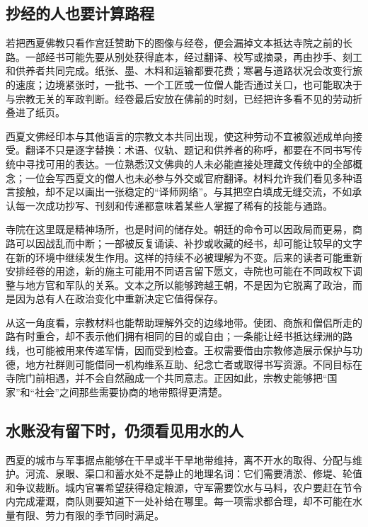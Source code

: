 \subsection{抄经的人也要计算路程}

若把西夏佛教只看作宫廷赞助下的图像与经卷，便会漏掉文本抵达寺院之前的长路。一部经书可能先要从别处获得底本，经过翻译、校写或摘录，再由抄手、刻工和供养者共同完成。纸张、墨、木料和运输都要花费；寒暑与道路状况会改变行旅的速度；边境紧张时，一批书、一个工匠或一位僧人能否通过关口，也可能取决于与宗教无关的军政判断。经卷最后安放在佛前的时刻，已经把许多看不见的劳动折叠进了纸页。

西夏文佛经印本与其他语言的宗教文本共同出现，使这种劳动不宜被叙述成单向接受。翻译不只是逐字替换：术语、仪轨、题记和供养者的称呼，都要在不同书写传统中寻找可用的表达。一位熟悉汉文佛典的人未必能直接处理藏文传统中的全部概念；一位会写西夏文的僧人也未必参与外交或官府翻译。材料允许我们看见多种语言接触，却不足以画出一张稳定的“译师网络”。与其把空白填成无缝交流，不如承认每一次成功抄写、刊刻和传递都意味着某些人掌握了稀有的技能与通路。

寺院在这里既是精神场所，也是时间的储存处。朝廷的命令可以因政局而更易，商路可以因战乱而中断；一部被反复诵读、补抄或收藏的经书，却可能让较早的文字在新的环境中继续发生作用。这样的持续不必被理解为不变。后来的读者可能重新安排经卷的用途，新的施主可能用不同语言留下愿文，寺院也可能在不同政权下调整与地方官和军队的关系。文本之所以能够跨越王朝，不是因为它脱离了政治，而是因为总有人在政治变化中重新决定它值得保存。

从这一角度看，宗教材料也能帮助理解外交的边缘地带。使团、商旅和僧侣所走的路有时重合，却不表示他们拥有相同的目的或自由；一条能让经书抵达绿洲的路线，也可能被用来传递军情，因而受到检查。王权需要借由宗教修造展示保护与功德，地方社群则可能借同一机构维系互助、纪念亡者或取得书写资源。不同目标在寺院门前相遇，并不会自然融成一个共同意志。正因如此，宗教史能够把“国家”和“社会”之间那些需要协商的地带照得更清楚。

\subsection{水账没有留下时，仍须看见用水的人}

西夏的城市与军事据点能够在干旱或半干旱地带维持，离不开水的取得、分配与维护。河流、泉眼、渠口和蓄水处不是静止的地理名词：它们需要清淤、修堤、轮值和争议裁断。城内官署希望获得稳定粮源，守军需要饮水与马料，农户要赶在节令内完成灌溉，商队则要知道下一处补给在哪里。每一项需求都合理，却不可能在水量有限、劳力有限的季节同时满足。


